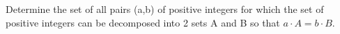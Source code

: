 Determine the set of all pairs (a,b) of positive integers for which the set of positive integers can be decomposed into 2 sets A and B so that $a\cdot A=b\cdot B$.